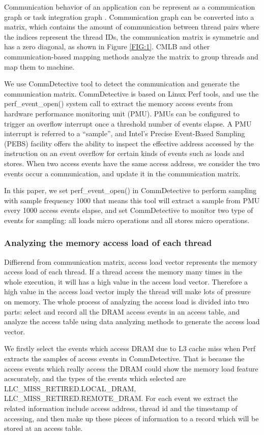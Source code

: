 \documentclass[a4paper,fleqn]{cas-sc}
\begin{document}
Communication behavior of an application can be represent as a communication graph or task integration graph \cite{17}. Communication graph can be converted into a matrix, which contains the amount of communication between thread pairs where the indices represent the thread IDs, the communication matrix is symmetric and has a zero diagonal, as shown in Figure \ref{FIG:1}. CMLB and other communication-based mapping methods analyze the matrix to group threads and map them to machine.


We use CommDetective tool to detect the communication and generate the communication matrix. CommDetective is based on Linux Perf tools, and use the perf\_event\_open() system call to extract the memory access events from hardware performance monitoring unit (PMU). PMUs can be configured to trigger an overflow interrupt once a threshold number of events elapse. A PMU interrupt is referred to a “sample”, and Intel’s Precise Event-Based Sampling (PEBS) \cite{18} facility offers the ability to inspect the effective address accessed by the instruction on an event overflow for certain kinds of events such as loads and stores.  When two access events have the same access address, we consider the two events occur a communication, and update it in the communication matrix.

In this paper, we set perf\_event\_open() in CommDetective to perform sampling with sample frequency 1000 that means this tool will extract a sample from PMU every 1000 access events elapse, and set CommDetective to monitor two type of events for sampling: all loads micro operations and all stores micro operations.

\subsubsection{Analyzing the memory access load of each thread}
Diffierend from communication matrix, access load vector represents the memory access load of each thread. If a thread access the memory many times in the whole execution, it will has a high value in the access load vector. Therefore a high value in the access load vector imply the thread will make lots of pressure on memory. The whole process of analyzing the access load is divided into two parts: select and record all the DRAM access events in an access table, and analyze the access table using data analyzing methods to generate the access load vector.

We firstly select the events which access DRAM due to L3 cache miss when Perf extracts the samples of access events in CommDetective. That is because the access events which really access the DRAM could show the memory load feature acscurately, and the types of the events which selected are LLC\_MISS\_RETIRED.LOCAL\_DRAM, LLC\_MISS\_RETIRED.REMOTE\_DRAM. For each event we extract the related information include access address, thread id and the timestamp of accessing, and then make up these pieces of information to a record which will be stored at an access table. 
\end{document}

